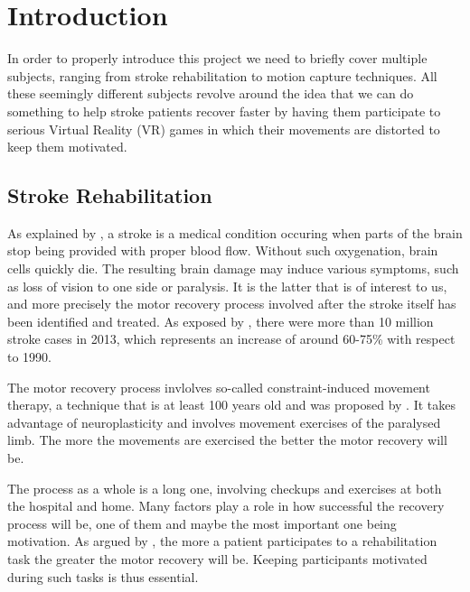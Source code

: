 
\chapter{Introduction} %

\label{Chapter1} %


In order to properly introduce this project we need to briefly cover multiple subjects, ranging from stroke rehabilitation to motion capture techniques. All these seemingly different subjects revolve around the idea that we can do something to help stroke patients recover faster by having them participate to serious Virtual Reality (VR) games in which their movements are distorted to keep them motivated.

\section{Stroke Rehabilitation}
As explained by \cite{nhlbi2017what}, a stroke is a medical condition occuring when parts of the brain stop being provided with proper blood flow. Without such oxygenation, brain cells quickly die. The resulting brain damage may induce various symptoms, such as loss of vision to one side or paralysis. It is the latter that is of interest to us, and more precisely the motor recovery process involved after the stroke itself has been identified and treated. As exposed by \cite{vos2015global}, there were more than 10 million stroke cases in 2013, which represents an increase of around 60-75\% with respect to 1990.

The motor recovery process invlolves so-called constraint-induced movement therapy, a technique that is at least 100 years old and was proposed by \cite{oden1918systematic}. It takes advantage of neuroplasticity and involves movement exercises of the paralysed limb. The more the movements are exercised the better the motor recovery will be.

The process as a whole is a long one, involving checkups and exercises at both the hospital and home. Many factors play a role in how successful the recovery process will be, one of them and maybe the most important one being motivation. As argued by \cite{flores2008improving}, the more a patient participates to a rehabilitation task the greater the motor recovery will be. Keeping participants motivated during such tasks is thus essential.

